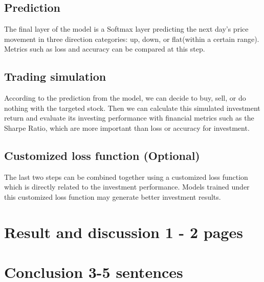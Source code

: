 \documentclass[11pt]{article}
\begin{document}
\subsection{Prediction}
The final layer of the model is a Softmax layer predicting the next day's price movement in three direction categories: up, down, or flat(within a certain range). Metrics such as loss and accuracy can be compared at this step.

\subsection{Trading simulation}
According to the prediction from the model, we can decide to buy, sell, or do nothing with the targeted stock. Then we can calculate this simulated investment return and evaluate its investing performance with financial metrics such as the Sharpe Ratio, which are more important than loss or accuracy for investment.

\subsection{Customized loss function (Optional)}
The last two steps can be combined together using a customized loss function which is directly related to the investment performance. Models trained under this customized loss function may generate better investment results.

\section{Result and discussion 1 - 2 pages}

\section{Conclusion 3-5 sentences}



\end{document}
